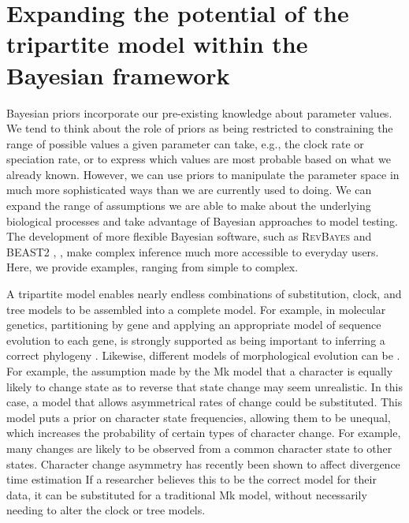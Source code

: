\section{Expanding the potential of the tripartite model within the Bayesian framework}

Bayesian priors incorporate our pre-existing knowledge about parameter values. %
We tend to think about the role of priors as being restricted to  constraining the range of possible values a given parameter can take, e.g., the clock rate or speciation rate, or to express which values are most probable based on what we already known.
However, we can use priors to manipulate the parameter space in much more sophisticated ways than we are currently used to doing.
We can expand the range of assumptions we are able to make about the underlying biological processes and take advantage of Bayesian approaches to model testing.
The development of more flexible Bayesian software, such as \textsc{RevBayes} \citep{Hoehna2014b, Hoehna2016b} and BEAST2 \citep{BEAST2},  \citep{Barido2018}, %
make complex inference much more accessible to everyday users.
Here, we provide examples, ranging from simple to complex.

A tripartite model enables nearly endless combinations of substitution, clock, and tree models to be assembled into a complete model.
For example, in molecular genetics, partitioning  by gene and applying an appropriate model of sequence evolution to each gene, is strongly supported as being important to inferring a correct phylogeny \citep{Brandley2005}.
Likewise, different models of morphological evolution can be . %
For example, the assumption made by the Mk model that a character is equally likely to change state as to reverse that state change may seem unrealistic.
In this case, a model that allows asymmetrical rates of change \citep{Ronquist2004} could be substituted.
 This  model puts a prior on character state frequencies, allowing them to be unequal, which increases the probability of certain types of character change.
 For example, many changes are likely to be observed from a common character state to other states.
Character change asymmetry has recently been shown to affect divergence time estimation 
If a researcher believes this to be the correct model for their data, it can be substituted for a traditional Mk model, without necessarily needing to alter the clock or tree models.

